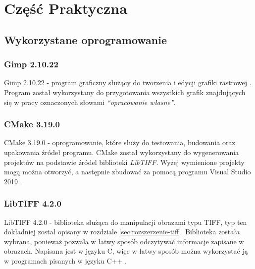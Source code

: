 \documentclass{article}
\begin{document}
    \section{Część Praktyczna}

        \subsection{Wykorzystane oprogramowanie}
        \subsubsection{Gimp 2.10.22}
        {
            \label{sec:gimp}
            \Large
            \justifying
            \quad
            Gimp 2.10.22 - program graficzny służący do tworzenia i edycji grafiki rastrowej \cite{Program GIMP}.
            Program został wykorzystany do przygotowania wszystkich grafik znajdujących się w pracy oznaczonych słowami \emph{``opracowanie własne''}.
        }

        \subsubsection{CMake 3.19.0}
        {
            \label{sec:cmake}
            \Large
            \justifying
            \quad
            CMake 3.19.0 - oprogramowanie, które służy do testowania, budowania oraz upakowania źródeł programu.
            CMake został wykorzystany do wygenerowania projektów na podstawie źródel biblioteki \emph{LibTIFF}.
            Wyżej wymienione projekty mogą można otworzyć, a następnie zbudować za pomocą programu {Visual Studio 2019} \cite{Program CMake}.
        }

        \subsubsection{LibTIFF 4.2.0}
        {
            \label{sec:LibTIFF}
            \Large
            \justifying
            \quad
            LibTIFF 4.2.0 - biblioteka służąca do manipulacji obrazami typu TIFF, typ ten dokładniej został opisany w rozdziale \ref{sec:rozszerzenie-tiff}.
            Biblioteka została wybrana, ponieważ pozwala w łatwy sposób odczytywać informacje zapisane w obrazach.
            Napisana jest w języku C, więc w łatwy sposób można wykorzystać ją w programach pisanych w języku C++ \cite{Biblioteka LibTIFF}.
        }
\end{document}
